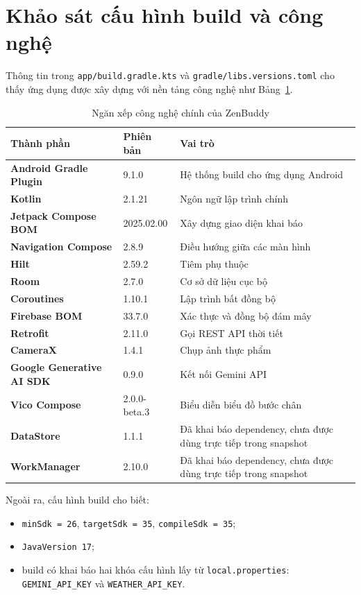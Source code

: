 \documentclass{zenbuddy-report}
\newcommand{\appname}{ZenBuddy}
\begin{document}
\section{Khảo sát cấu hình build và công nghệ}
Thông tin trong \texttt{app/build.gradle.kts} và \texttt{gradle/libs.versions.toml} cho thấy ứng dụng được xây dựng với nền tảng công nghệ như Bảng~\ref{tab:tech-stack}.

\begin{table}[H]
\centering
\caption{Ngăn xếp công nghệ chính của \appname}
\label{tab:tech-stack}
\begin{tabularx}{\textwidth}{>{\bfseries}p{3.6cm}p{3.2cm}X}
\toprule
Thành phần & Phiên bản & Vai trò \\
\midrule
Android Gradle Plugin & 9.1.0 & Hệ thống build cho ứng dụng Android \\
Kotlin & 2.1.21 & Ngôn ngữ lập trình chính \\
Jetpack Compose BOM & 2025.02.00 & Xây dựng giao diện khai báo \\
Navigation Compose & 2.8.9 & Điều hướng giữa các màn hình \\
Hilt & 2.59.2 & Tiêm phụ thuộc \\
Room & 2.7.0 & Cơ sở dữ liệu cục bộ \\
Coroutines & 1.10.1 & Lập trình bất đồng bộ \\
Firebase BOM & 33.7.0 & Xác thực và đồng bộ đám mây \\
Retrofit & 2.11.0 & Gọi REST API thời tiết \\
CameraX & 1.4.1 & Chụp ảnh thực phẩm \\
Google Generative AI SDK & 0.9.0 & Kết nối Gemini API \\
Vico Compose & 2.0.0-beta.3 & Biểu diễn biểu đồ bước chân \\
DataStore & 1.1.1 & Đã khai báo dependency, chưa được dùng trực tiếp trong snapshot \\
WorkManager & 2.10.0 & Đã khai báo dependency, chưa được dùng trực tiếp trong snapshot \\
\bottomrule
\end{tabularx}
\end{table}

Ngoài ra, cấu hình build cho biết:
\begin{itemize}
  \item \texttt{minSdk = 26}, \texttt{targetSdk = 35}, \texttt{compileSdk = 35};
  \item \texttt{JavaVersion 17};
  \item build có khai báo hai khóa cấu hình lấy từ \texttt{local.properties}: \texttt{GEMINI\_API\_KEY} và \texttt{WEATHER\_API\_KEY}.
\end{itemize}
\end{document}
